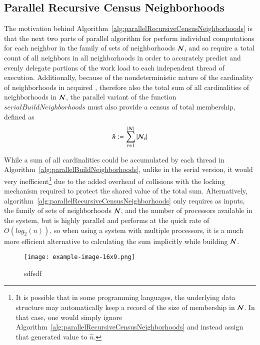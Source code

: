 %
%
\subsection{Parallel Recursive Census Neighborhoods}
\label{ch6sBNPssPRCN}
The motivation behind Algorithm~\ref{alg:parallelRecursiveCensusNeighborhoods} is that the next two parts of parallel algorithm for  perform individual computations for each neighbor in the family of sets of neighborhoods $\mathcal{N}$, and so require a total count of all neighbors in all neighborhoods in order to accurately predict and evenly delegate portions of the work load to each independent thread of execution. Additionally, because of the nondeterministic nature of the cardinality of neighborhoods in acquired \tdd{}, therefore also the total sum of all cardinalities of neighborhoods in $\mathcal{N}$, the parallel variant of the function $\mathit{serialBuildNeighborhoods}$ must also provide a census of total membership, defined as
%
\begin{equation}
	\hat{n} := \sum\limits_{v=1}^{|\mathcal{N}|}{|\mathcal{N}_v|}
	\label{eq:censusNeighborhoods}
\end{equation}%
%

While a sum of all cardinalities could be accumulated by each thread in  Algorithm~\ref{alg:parallelBuildNeighborhoods}, unlike in the serial version, it would very inefficient\footnote{It is possible that in some programming languages, the underlying data structure may automatically keep a record of the size of membership in $\mathcal{N}$. In that case, one would simply ignore Algorithm~\ref{alg:parallelRecursiveCensusNeighborhoods} and instead assign that generated value to $\hat{n}$.} due to the added overhead of collisions with the locking mechanism required to protect the shared value of the total sum.  Alternatively, algorithm~\ref{alg:parallelRecursiveCensusNeighborhoods} only requires as inputs, the family of sets of neighborhoods $\mathcal{N}$, and the number of processors available in the system, but is highly parallel and performs at the quick rate of $O(log_2(n))$, so when using a system with multiple processors, it is a much more efficient alternative to calculating the sum implicitly while building $\mathcal{N}$.

\begin{figure}[ht]
	{\texttt{[image: example-image-16x9.png]}}
	{\caption[wefwefwef]{sdfsdf}\label{fig:wfwef}}
\end{figure}

